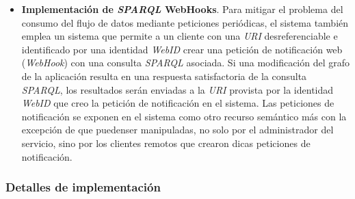 \begin{itemize}
\item \textbf{Implementaci\'on de \textit{SPARQL} WebHooks}. Para mitigar el problema del consumo del flujo de datos mediante peticiones peri\'odicas, el sistema tambi\'en emplea un sistema que permite a un cliente con una \textit{URI} desreferenciable e identificado por una identidad \textit{WebID} crear una petici\'on de notificaci\'on web (\textit{WebHook}) con una consulta \textit{SPARQL} asociada. Si una modificaci\'on del grafo de la aplicaci\'on resulta en una respuesta satisfactoria de la consulta \textit{SPARQL}, los resultados ser\'an enviadas a la \textit{URI} provista por la identidad \textit{WebID} que creo la petici\'on de notificaci\'on en el sistema. Las peticiones de notificaci\'on se exponen en el sistema como otro recurso sem\'antico m\'as con la excepci\'on de que puedenser manipuladas, no solo por el administrador del servicio, sino por los clientes remotos que crearon dicas peticiones de notificaci\'on.
\end{itemize}

\subsubsection{Detalles de implementaci\'on}

